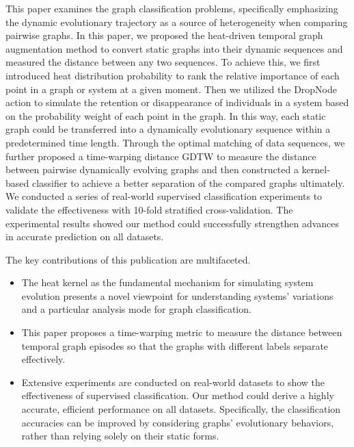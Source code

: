 \documentclass[10pt,journal,compsoc]{IEEEtran}
\begin{document}
This paper examines the graph classification problems, specifically emphasizing the dynamic evolutionary trajectory as a source of heterogeneity when comparing pairwise graphs. In this paper, we proposed the  heat-driven temporal graph augmentation method to convert static graphs into their dynamic sequences and measured the distance between any two sequences. To achieve this, we first introduced heat distribution probability to rank the relative importance of each point in a graph or system at a given moment. Then we utilized the DropNode action to simulate the retention or disappearance of individuals in a system based on the probability weight of each point in the graph. In this way, each static graph could be transferred into a dynamically evolutionary sequence within a predetermined time length. Through the optimal matching of data sequences, we further proposed a time-warping distance GDTW to measure the distance between pairwise dynamically evolving graphs and then constructed a kernel-based classifier to achieve a better separation of the compared graphs ultimately. We conducted a series of real-world supervised classification experiments to validate the effectiveness with 10-fold stratified cross-validation. The experimental results showed our method could successfully strengthen advances in accurate prediction on all datasets.


The key contributions of this publication are multifaceted.
\begin{itemize}
\item[(1)] The heat kernel as the fundamental mechanism for simulating system evolution presents a novel viewpoint for understanding systems' variations and a particular analysis mode for graph classification.
\item[(2)] This paper proposes a time-warping metric to measure the distance between temporal graph episodes so that the graphs with different labels separate effectively.
\item[(3)] Extensive experiments are conducted on real-world datasets to show the effectiveness of supervised classification. Our method could derive a highly accurate, efficient performance on all datasets. Specifically, the classification accuracies can be improved by considering graphs' evolutionary behaviors, rather than relying solely on their static forms.
\end{itemize}
\end{document}
